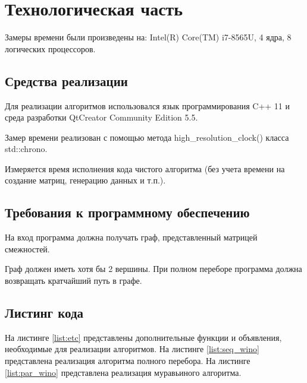 \documentclass[a4paper,12pt]{report}
\begin{document}
    \chapter{Технологическая часть}
        \label{sec:tecnologic_part}

        	Замеры времени были произведены на: Intel(R) Core(TM) i7-8565U, 4 ядра, 8 логических процессоров.

	\section{Средства реализации}

			Для реализации алгоритмов использовался язык программирования C++ 11 и среда разработки QtCreator Community Edition 5.5.
			 
			Замер времени реализован с помощью метода high\_resolution\_clock() класса std::chrono.
			
			Измеряется время исполнения кода чистого алгоритма (без учета времени на создание матриц, генерацию данных и т.п.).\\

	\section{Требования к программному обеспечению}

			На вход программа должна получать граф, представленный матрицей смежностей. 
			
			Граф должен иметь хотя бы 2 вершины. 
			При полном переборе программа должна возвращать кратчайший путь в графе.

	\section{Листинг кода}

        	На листинге \ref{list:etc} представлены дополнительные функции и объявления, необходимые для реализации алгоритмов.
        	На листинге \ref{list:seq_wino} представлена реализация алгоритма полного перебора.
        	На листинге \ref{list:par_wino} представлена реализация муравьиного алгоритма.\\
        	
\end{document}
